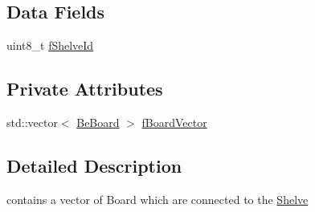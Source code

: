\subsection*{Data Fields}
\begin{DoxyCompactItemize}
\item 
uint8\-\_\-t \hyperlink{class_ph2___hw_description_1_1_shelve_ad6a771be1946db28ff6418ac419ef543}{f\-Shelve\-Id}
\end{DoxyCompactItemize}
\subsection*{Private Attributes}
\begin{DoxyCompactItemize}
\item 
std\-::vector$<$ \hyperlink{class_ph2___hw_description_1_1_be_board}{Be\-Board} $>$ \hyperlink{class_ph2___hw_description_1_1_shelve_a5b87ee50bb6046acadaeb8226395da52}{f\-Board\-Vector}
\end{DoxyCompactItemize}


\subsection{Detailed Description}
contains a vector of Board which are connected to the \hyperlink{class_ph2___hw_description_1_1_shelve}{Shelve} 

